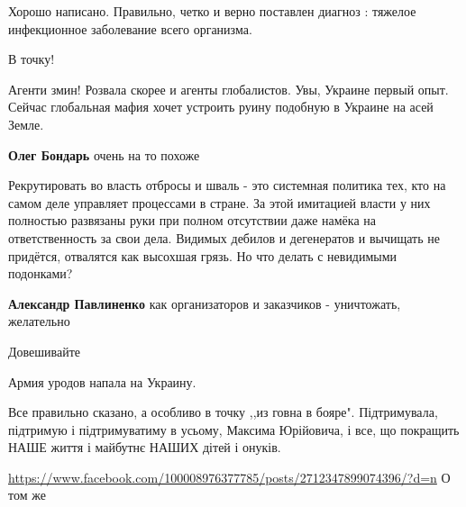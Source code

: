 \begin{itemize}
Хорошо написано. Правильно, четко и верно поставлен диагноз : тяжелое инфекционное заболевание всего организма.

В точку!

Агенти змин! Розвала скорее и агенты глобалистов. Увы, Украине первый опыт. Сейчас глобальная мафия хочет устроить руину подобную в Украине на асей Земле.

\begin{itemize} %
\textbf{Олег Бондарь} очень на то похоже
\end{itemize} %


Рекрутировать во власть отбросы и шваль - это системная политика тех, кто на
самом деле управляет процессами в стране. За этой имитацией власти у них
полностью развязаны руки при полном отсутствии даже намёка на ответственность
за свои дела. Видимых дебилов и дегенератов и вычищать не придётся, отвалятся
как высохшая грязь. Но что делать с невидимыми подонками?

\begin{itemize} %
\textbf{Александр Павлиненко} как организаторов и заказчиков - уничтожать, желательно
\end{itemize} %

Довешивайте

Армия уродов напала на Украину.


Все правильно сказано, а особливо в точку ,,из говна в
бояре". Підтримувала, підтримую і підтримуватиму в усьому, Максима Юрійовича, і
все, що покращить НАШЕ життя і майбутнє НАШИХ дітей і онуків.

\url{https://www.facebook.com/100008976377785/posts/2712347899074396/?d=n}
О том же

\end{itemize} %
